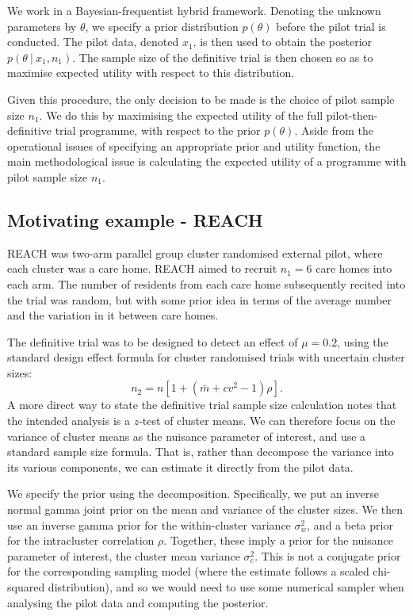 \documentclass[sagev, Crown]{sagej} %
\begin{document}
We work in a Bayesian-frequentist hybrid framework. Denoting the unknown parameters by $\theta$, we specify a prior distribution $p(\theta)$ before the pilot trial is conducted. The pilot data, denoted $x_1$, is then used to obtain the posterior $p(\theta ~|~ x_1, n_1)$. The sample size of the definitive trial is then chosen so as to maximise expected utility with respect to this distribution.

Given this procedure, the only decision to be made is the choice of pilot sample size $n_1$. We do this by maximising the expected utility of the full pilot-then-definitive trial programme, with respect to the prior $p(\theta)$. Aside from the operational issues of specifying an appropriate prior and utility function, the main methodological issue is calculating the expected utility of a programme with pilot sample size $n_1$. 

\subsection{Motivating example - REACH}

REACH was two-arm parallel group cluster randomised external pilot, where each cluster was a care home. REACH aimed to recruit $n_1 = 6$ care homes into each arm. The number of residents from each care home subsequently recited into the trial was random, but with some prior idea in terms of the average number and the variation in it between care homes. 

The definitive trial was to be designed to detect an effect of $\mu = 0.2$, using the standard design effect formula for cluster randomised trials with uncertain cluster sizes:
$$
n_2 = n [1 + (\bar{m} + cv^2 - 1)\rho].
$$
A more direct way to state the definitive trial sample size calculation notes that the intended analysis is a $z$-test of cluster means. We can therefore focus on the variance of cluster means as the nuisance parameter of interest, and use a standard sample size formula. That is, rather than decompose the variance into its various components, we can estimate it directly from the pilot data.

We specify the prior using the decomposition. Specifically, we put an inverse normal gamma joint prior on the mean and variance of the cluster sizes. We then use an inverse gamma prior for the within-cluster variance $\sigma_w^2$, and a beta prior for the intracluster correlation $\rho$. Together, these imply a prior for the nuisance parameter of interest, the cluster mean variance $\sigma^2_c$. This is not a conjugate prior for the corresponding sampling model (where the estimate follows a scaled chi-squared distribution), and so we would need to use some numerical sampler when analysing the pilot data and computing the posterior.
\end{document}
